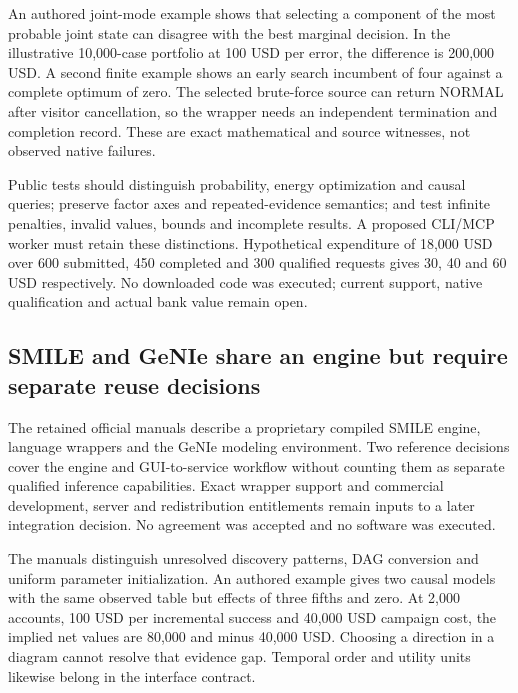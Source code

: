An authored joint-mode example shows that selecting a component of the
most probable joint state can disagree with the best marginal decision.
In the illustrative 10,000-case portfolio at 100 USD per error, the
difference is 200,000 USD. A second finite example shows an early search
incumbent of four against a complete optimum of zero. The selected
brute-force source can return NORMAL after visitor cancellation, so the
wrapper needs an independent termination and completion record. These
are exact mathematical and source witnesses, not observed native
failures. \citep{exec24_opengm_source,exec24_opengm_choice}

Public tests should distinguish probability, energy optimization and
causal queries; preserve factor axes and repeated-evidence semantics;
and test infinite penalties, invalid values, bounds and incomplete
results. A proposed CLI/MCP worker must retain these distinctions.
Hypothetical expenditure of 18,000 USD over 600 submitted, 450 completed
and 300 qualified requests gives 30, 40 and 60 USD respectively. No
downloaded code was executed; current support, native qualification and
actual bank value remain open. \citep{exec24_opengm_choice}

\hypertarget{smile-and-genie-share-an-engine-but-require-separate-reuse-decisions}{%
\subsection{SMILE and GeNIe share an engine but require separate reuse
decisions}\label{smile-and-genie-share-an-engine-but-require-separate-reuse-decisions}}

The retained official manuals describe a proprietary compiled SMILE
engine, language wrappers and the GeNIe modeling environment. Two
reference decisions cover the engine and GUI-to-service workflow without
counting them as separate qualified inference capabilities. Exact
wrapper support and commercial development, server and redistribution
entitlements remain inputs to a later integration decision. No agreement
was accepted and no software was executed.
\citep{exec13_smile_intro,exec13_smile_license,exec24_smile_choice}

The manuals distinguish unresolved discovery patterns, DAG conversion
and uniform parameter initialization. An authored example gives two
causal models with the same observed table but effects of three fifths
and zero. At 2,000 accounts, 100 USD per incremental success and 40,000
USD campaign cost, the implied net values are 80,000 and minus 40,000
USD. Choosing a direction in a diagram cannot resolve that evidence gap.
Temporal order and utility units likewise belong in the interface
contract.
\citep{exec13_smile_pc,exec13_smile_pattern,exec13_genie_pattern,exec13_ct_smile_tutorial,exec16_cp_bayesfusion,exec24_smile_choice}

